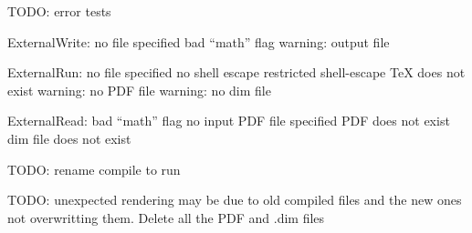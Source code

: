 \documentclass[10pt]{ltxdoc}
\begin{document}
TODO: error tests

ExternalWrite:
  no file specified
  bad ``math'' flag
  warning: output file

ExternalRun:
  no file specified
  no shell escape
  restricted shell-escape
  TeX does not exist
  warning: no PDF file
  warning: no dim file

ExternalRead:
  bad ``math'' flag
  no input PDF file specified
  PDF does not exist
  dim file does not exist

TODO: rename compile to run

TODO: unexpected rendering may be due to old compiled files and the new ones not overwritting them.  Delete all the PDF and .dim files
\end{document}
